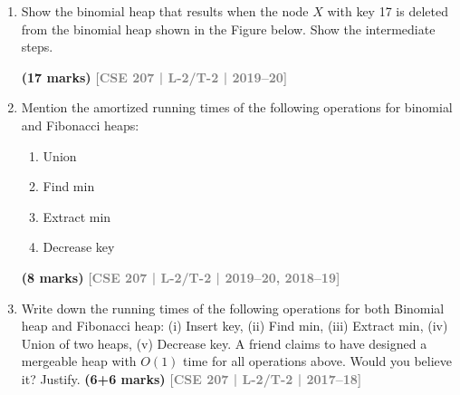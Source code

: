 \documentclass[12pt]{article}
\newcommand{\yr}[1]{\hfill\textcolor{gray}{\small\textbf{[#1]}}}
\newcommand{\mk}[1]{\textcolor{orange!70!black}{\small\textbf{(#1 marks)}}}
\begin{document}
\begin{enumerate}
\begin{enumerate}
\item Evaluate the total actual cost in credits of the extract-max operations in the previous question. Assume that unlinking a node from its children takes one credit, a node addition operation takes one credit, an insertion of a node takes one credit, and a comparison takes one credit.
\mk{5} \yr{CSE 207 | L-2/T-2 | 2021--22}


\item A friend of yours claims that it is possible to implement Find-Min operation in a Binomial Min Heap in $O(1)$ time using the idea of Fibonacci Min Heap. Justify his claim with proper explanation.
\mk{10} \yr{CSE 207 | L-2/T-2 | 2020--21}

\item A binomial heap has 19 nodes. Find out the binomial trees this binomial heap has.
\mk{5} \yr{CSE 207 | L-2/T-2 | 2020--21}


\end{enumerate}


\item Show the binomial heap that results when the node $X$ with key 17 is deleted from the binomial heap shown in the Figure below. Show the intermediate steps.
\begin{center}
\FigHpDelA
\end{center}

\mk{17} \yr{CSE 207 | L-2/T-2 | 2019--20}



\item Mention the amortized running times of the following operations for binomial and Fibonacci heaps:
\begin{enumerate}
\item Union
\item Find min
\item Extract min
\item Decrease key
\end{enumerate}
\mk{8} \yr{CSE 207 | L-2/T-2 | 2019--20, 2018--19}






\item Write down the running times of the following operations for both Binomial heap and Fibonacci heap: (i) Insert key, (ii) Find min, (iii) Extract min, (iv) Union of two heaps, (v) Decrease key. A friend claims to have designed a mergeable heap with $O(1)$ time for all operations above. Would you believe it? Justify. \mk{6+6}
\yr{CSE 207 | L-2/T-2 | 2017--18}




\end{enumerate}
\end{document}

